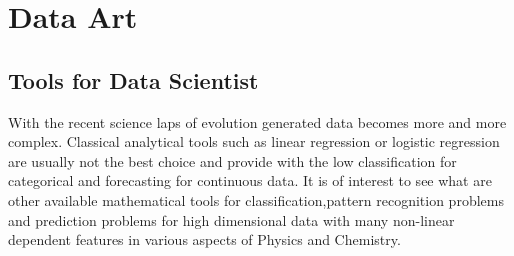 
\chapter{Data Art}
\section{Tools for Data Scientist}
With the recent science laps of evolution generated data becomes more and more complex. Classical analytical tools such as linear regression or logistic regression are usually not the best choice and provide with the low classification for categorical and forecasting for continuous data. It is of interest to see what are other available mathematical tools for classification,pattern recognition problems and prediction problems for high dimensional data with many non-linear dependent features in various aspects of Physics and Chemistry. 
